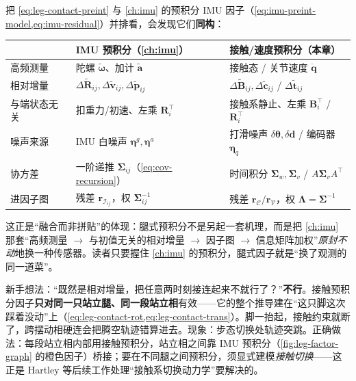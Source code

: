 \begin{insight}[接触预积分 = IMU 预积分换一种“高频测量”]\label{ins:leg-preint-iso}
把 \cref{eq:leg-contact-preint} 与 \cref{ch:imu} 的预积分 IMU 因子（\cref{eq:imu-preint-model,eq:imu-residual}）并排看，会发现它们\textbf{同构}：
\begin{center}\small
\begin{tabular}{lll}
\toprule
 & IMU 预积分（\cref{ch:imu}） & 接触/速度预积分（本章） \\
\midrule
高频测量 & 陀螺 $\tilde{\boldsymbol{\omega}}$、加计 $\tilde{\mathbf{a}}$ & 接触态 / 关节速度 $\dot{\mathbf{q}}$ \\
相对增量 & $\Delta\tilde{\mathbf{R}}_{ij},\Delta\tilde{\mathbf{v}}_{ij},\Delta\tilde{\mathbf{p}}_{ij}$ & $\Delta\tilde{\mathbf{B}}_{ij},\Delta\tilde{\mathbf{c}}_{ij}$ / $\Delta\tilde{\mathbf{t}}_{ij}$ \\
与端状态无关 & 扣重力/初速、左乘 $\mathbf{R}_i^\top$ & 接触系静止、左乘 $\mathbf{B}_i^\top$ / $\mathbf{R}_i^\top$ \\
噪声来源 & IMU 白噪声 $\boldsymbol{\eta}^g,\boldsymbol{\eta}^a$ & 打滑噪声 $\delta\boldsymbol{\theta},\delta\mathbf{d}$ / 编码器 $\boldsymbol{\eta}_q$ \\
协方差 & 一阶递推 $\boldsymbol{\Sigma}_{ij}$（\cref{eq:cov-recursion}） & 时间积分 $\boldsymbol{\Sigma}_w,\boldsymbol{\Sigma}_v$ / $A\boldsymbol{\Sigma}_v A^\top$ \\
进因子图 & 残差 $\mathbf{r}_{\mathcal{I}_{ij}}$，权 $\boldsymbol{\Sigma}_{ij}^{-1}$ & 残差 $\mathbf{r}_{\mathcal{C}}/\mathbf{r}_{\mathcal{V}}$，权 $\boldsymbol{\Lambda}=\boldsymbol{\Sigma}^{-1}$ \\
\bottomrule
\end{tabular}
\end{center}
这正是“融合而非拼贴”的体现：腿式预积分不是另起一套机理，而是把 \cref{ch:imu} 那套“高频测量 $\to$ 与初值无关的相对增量 $\to$ 因子图 $\to$ 信息矩阵加权”\emph{原封不动}地换一种传感器。读者只要握住 \cref{ch:imu} 的预积分，腿式因子就是“换了观测的同一道菜”。
\end{insight}

\begin{pitfall}
新手想法：“既然是相对增量，把任意两时刻接连起来不就行了？”\textbf{不行}。接触预积分因子\textbf{只对同一只站立腿、同一段站立相}有效——它的整个推导建在“这只脚这次踩着没动”上（\cref{eq:leg-contact-rot,eq:leg-contact-trans}）。脚一抬起，接触约束就断了，跨摆动相硬连会把腾空轨迹错算进去。现象：步态切换处轨迹突跳。正确做法：每段站立相内部用接触预积分，站立相之间靠 IMU 预积分（\cref{fig:leg-factor-graph} 的橙色因子）桥接；要在不同腿之间预积分，须显式建模\emph{接触切换}\cite{hartley2018legged}——这正是 Hartley 等后续工作处理“接触系切换动力学”要解决的。
\end{pitfall}

